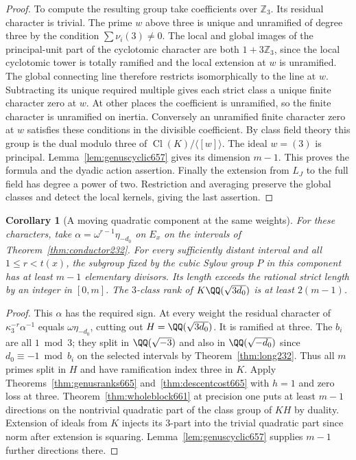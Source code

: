 \documentclass[a4paper,11pt]{article}
\newtheorem{corollary}[proposition]{Corollary}
\theoremstyle{definition}
\theoremstyle{remark}
\newcommand{\ZZ}{\mathbb Z}\newcommand{\ord}{\operatorname{ord}}
\numberwithin{equation}{section}
\newcommand{\Cl}{\operatorname{Cl}}
\begin{document}
\begin{proof}
To compute the resulting group take coefficients over \(\ZZ_3\).
Its residual character is trivial. The prime \(w\) above three
is unique and unramified of degree three by the condition
\(\sum\nu_i(3)\ne0\). The local and global images of the
principal-unit part of the cyclotomic character are both \(1+3\ZZ_3\), since the
local cyclotomic tower is totally ramified and the local
extension at \(w\) is unramified. The global connecting line
therefore restricts isomorphically to the line at \(w\).
Subtracting its unique required multiple gives each strict
class a unique finite character zero at \(w\). At other places
the coefficient is unramified, so the finite character is
unramified on inertia. Conversely an unramified finite character
zero at \(w\) satisfies these conditions in the divisible
coefficient. By class field theory this group is the dual
modulo three of \(\Cl(K)/\langle[w]\rangle\). The ideal \(w=(3)\)
is principal. Lemma~\ref{lem:genuscyclic657} gives its dimension
\(m-1\). This proves the formula and the dyadic action assertion.
Finally the extension from \(L_J\) to the full field has degree
a power of two. Restriction and averaging preserve the global
classes and detect the local kernels, giving the last assertion.
\end{proof}

\begin{corollary}[A moving quadratic component at the same weights]
\leavevmode\label{cor:sexticmoving669}
For these characters, take
\(\alpha=\omega^{r-1}\eta_{-d_0}\) on \(E_x\) on the intervals of
Theorem~\ref{thm:conductor232}. For every sufficiently distant
interval and all \(1\le r<t(x)\), the subgroup fixed by the
cubic Sylow group \(P\) in this component has at least \(m-1\)
elementary divisors. Its length exceeds the rational strict
length by an integer in \([0,m]\). The \(3\)-class rank of
\(K\QQ(\sqrt{3d_0})\) is at least \(2(m-1)\).
\end{corollary}
\begin{proof}
This \(\alpha\) has the required sign. At every weight the
residual character of \(\kappa_3^{-r}\alpha^{-1}\) equals
\(\omega\eta_{-d_0}\), cutting out \(H=\QQ(\sqrt{3d_0})\).
It is ramified at three. The \(b_i\) are all \(1\bmod3\);
they split in \(\QQ(\sqrt{-3})\) and also in \(\QQ(\sqrt{-d_0})\)
since \(d_0\equiv-1\bmod b_i\) on the selected intervals by
Theorem~\ref{thm:long232}. Thus all \(m\) primes split in \(H\)
and have ramification index three in \(K\). Apply
Theorems~\ref{thm:genusranks665} and~\ref{thm:descentcost665}
with \(h=1\) and zero loss at three. Theorem~\ref{thm:wholeblock661}
at precision one puts at least \(m-1\) directions on the
nontrivial quadratic part of the class group of \(KH\) by
duality. Extension of ideals from \(K\) injects its \(3\)-part
into the trivial quadratic part since norm after extension is
squaring. Lemma~\ref{lem:genuscyclic657} supplies \(m-1\) further
directions there.
\end{proof}
\end{document}
